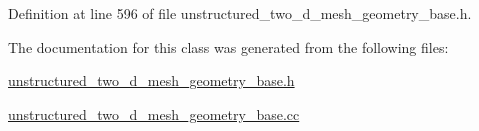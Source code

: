 Definition at line 596 of file unstructured\+\_\+two\+\_\+d\+\_\+mesh\+\_\+geometry\+\_\+base.\+h.



The documentation for this class was generated from the following files\+:\begin{DoxyCompactItemize}
\item 
\hyperlink{unstructured__two__d__mesh__geometry__base_8h}{unstructured\+\_\+two\+\_\+d\+\_\+mesh\+\_\+geometry\+\_\+base.\+h}\item 
\hyperlink{unstructured__two__d__mesh__geometry__base_8cc}{unstructured\+\_\+two\+\_\+d\+\_\+mesh\+\_\+geometry\+\_\+base.\+cc}\end{DoxyCompactItemize}
